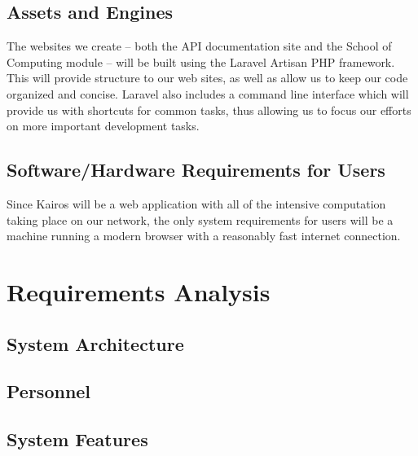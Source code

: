 \documentclass{extarticle}
\begin{document}
\subsection{Assets and Engines}
The websites we create -- both the API documentation site and the School of Computing module -- will be built using
the Laravel Artisan PHP framework.  This will provide structure to our web sites, as well as allow us to keep our
code organized and concise.  Laravel also includes a command line interface which will provide us with shortcuts
for common tasks, thus allowing us to focus our efforts on more important development tasks.

\subsection{Software/Hardware Requirements for Users}
Since Kairos will be a web application with all of the intensive computation taking place on our network, the only
system requirements for users will be a machine running a modern browser with a reasonably fast internet connection.

\section{Requirements Analysis}

\subsection{System Architecture}

\subsection{Personnel}

\subsection{System Features}
\end{document}
